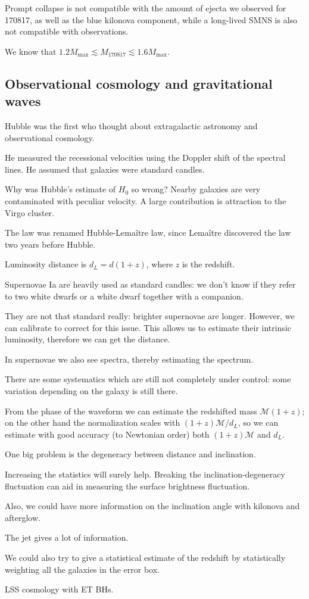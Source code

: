 \documentclass[main.tex]{subfiles}
\begin{document}

Prompt collapse is not compatible with the amount of ejecta we observed 
for 170817, as well as the blue kilonova component, 
while a long-lived SMNS is also not compatible with observations.

We know that \(1.2 M _{\text{max}} \lesssim M _{\text{170817}} \lesssim 1.6 M _{\text{max}}\).

\subsection{Observational cosmology and gravitational waves}

Hubble was the first who thought about extragalactic astronomy and observational cosmology. 

He measured the recessional velocities using the Doppler shift of the spectral lines. 
He assumed that galaxies were standard candles.

Why was Hubble's estimate of \(H_0 \) so wrong? 
Nearby galaxies are very contaminated with peculiar velocity. 
A large contribution is attraction to the Virgo cluster. 

The law was renamed Hubble-Lemaître law, since Lemaître discovered the law two years 
before Hubble. 

Luminosity distance is \(d_L = d (1+ z)\), where \(z\) is the redshift.

Supernovae Ia are heavily used as standard candles: we don't know if they
refer to two white dwarfs or a white dwarf together with a companion. 

They are not that standard really: brighter supernovae are longer. 
However, we can calibrate to correct for this issue. 
This allows us to estimate their intrinsic luminosity, therefore 
we can get the distance.

In supernovae we also see spectra, thereby estimating the spectrum. 

There are some systematics which are still not completely under control: 
some variation depending on the galaxy is still there. 

From the phase of the waveform we can estimate the redshifted mass \(\mathcal{M} (1+z)\); 
on the other hand the normalization scales with \((1+z) \mathcal{M} / d_L\), so we can 
estimate with good accuracy (to Newtonian order) both \((1+z) \mathcal{M}\) and \(d_L\). 

One big problem is the degeneracy between distance and inclination. 

Increasing the statistics will surely help. 
Breaking the inclination-degeneracy fluctuation 
can aid in measuring the surface brightness fluctuation. 

Also, we could have more information on the inclination angle with kilonova and afterglow. 

The jet gives a lot of information. 

We could also try to give a statistical estimate of the redshift 
by statistically weighting all the galaxies in the error box. 

LSS cosmology with ET BHs. 
\end{document}
